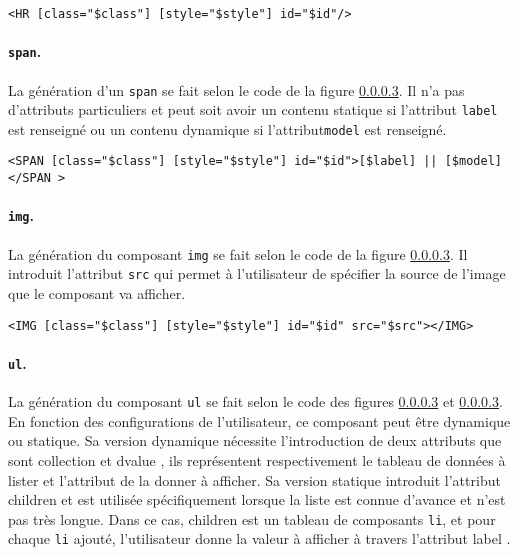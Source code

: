 \documentclass[a4paper,11pt]{report}
\begin{document}
\begin{verbatim}
<HR [class="$class"] [style="$style"] id="$id"/>
\end{verbatim}

\paragraph{{\tt span}.} La génération d'un {\tt span} se fait selon le code de la figure \ref{}. Il n'a pas d'attributs particuliers et peut soit
avoir un contenu statique si l'attribut {\tt label} est renseigné ou un contenu dynamique si l'attribut{\tt model} est renseigné.

\begin{verbatim}
<SPAN [class="$class"] [style="$style"] id="$id">[$label] || [$model]</SPAN	>
\end{verbatim}

\paragraph{{\tt img}.} La génération du composant {\tt img} se fait selon le code de la figure \ref{}. Il introduit l'attribut {\tt src} qui permet
à l'utilisateur de spécifier la source de l'image que le composant va afficher.

\begin{verbatim}
<IMG [class="$class"] [style="$style"] id="$id" src="$src"></IMG>
\end{verbatim}

\paragraph{{\tt ul}.}La génération du composant {\tt ul} se fait selon le code des figures \ref{} et \ref{}. En fonction des configurations de l'utilisateur, ce composant
peut être dynamique ou statique. Sa version dynamique nécessite l'introduction de deux attributs que sont \og collection \fg et \og dvalue \fg, ils représentent 
respectivement le tableau de données à lister et l'attribut de la donner à afficher. Sa version statique introduit l'attribut \og children \fg et est utilisée spécifiquement 
lorsque la liste est connue d'avance et n'est pas très longue. Dans ce cas, \og children \fg est un tableau de composants {\tt li}, et pour chaque {\tt li} ajouté, l'utilisateur
donne la valeur à afficher à travers l'attribut \og label \fg .
\end{document}
